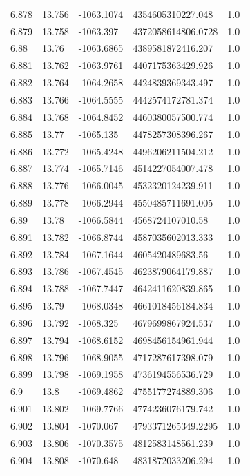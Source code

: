 \begin{tabular}{lllll}
6.878 & 13.756 & -1063.1074 & 4354605310227.048 & 1.0 \\
6.879 & 13.758 & -1063.397 & 4372058614806.0728 & 1.0 \\
6.88 & 13.76 & -1063.6865 & 4389581872416.207 & 1.0 \\
6.881 & 13.762 & -1063.9761 & 4407175363429.926 & 1.0 \\
6.882 & 13.764 & -1064.2658 & 4424839369343.497 & 1.0 \\
6.883 & 13.766 & -1064.5555 & 4442574172781.374 & 1.0 \\
6.884 & 13.768 & -1064.8452 & 4460380057500.774 & 1.0 \\
6.885 & 13.77 & -1065.135 & 4478257308396.267 & 1.0 \\
6.886 & 13.772 & -1065.4248 & 4496206211504.212 & 1.0 \\
6.887 & 13.774 & -1065.7146 & 4514227054007.478 & 1.0 \\
6.888 & 13.776 & -1066.0045 & 4532320124239.911 & 1.0 \\
6.889 & 13.778 & -1066.2944 & 4550485711691.005 & 1.0 \\
6.89 & 13.78 & -1066.5844 & 4568724107010.58 & 1.0 \\
6.891 & 13.782 & -1066.8744 & 4587035602013.333 & 1.0 \\
6.892 & 13.784 & -1067.1644 & 4605420489683.56 & 1.0 \\
6.893 & 13.786 & -1067.4545 & 4623879064179.887 & 1.0 \\
6.894 & 13.788 & -1067.7447 & 4642411620839.865 & 1.0 \\
6.895 & 13.79 & -1068.0348 & 4661018456184.834 & 1.0 \\
6.896 & 13.792 & -1068.325 & 4679699867924.537 & 1.0 \\
6.897 & 13.794 & -1068.6152 & 4698456154961.944 & 1.0 \\
6.898 & 13.796 & -1068.9055 & 4717287617398.079 & 1.0 \\
6.899 & 13.798 & -1069.1958 & 4736194556536.729 & 1.0 \\
6.9 & 13.8 & -1069.4862 & 4755177274889.306 & 1.0 \\
6.901 & 13.802 & -1069.7766 & 4774236076179.742 & 1.0 \\
6.902 & 13.804 & -1070.067 & 4793371265349.2295 & 1.0 \\
6.903 & 13.806 & -1070.3575 & 4812583148561.239 & 1.0 \\
6.904 & 13.808 & -1070.648 & 4831872033206.294 & 1.0 \\

\end{tabular}
